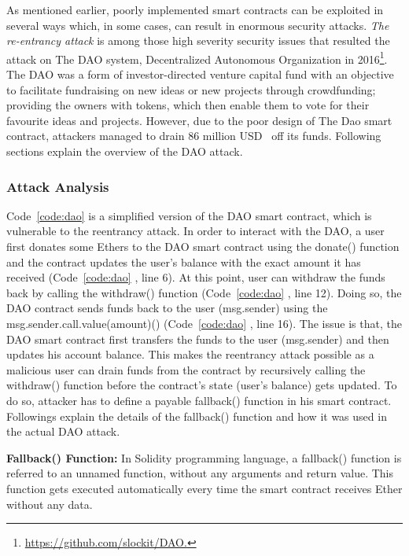 
As mentioned earlier, poorly implemented smart contracts can be exploited in several ways which, in some cases, can result in enormous security attacks. \textit{The re-entrancy attack} is among those high severity security issues that resulted the attack on The DAO system, Decentralized Autonomous Organization in 2016\footnote{\url{https://github.com/slockit/DAO.}}. The DAO was a form of investor-directed venture capital fund with an objective to facilitate fundraising on new ideas or new projects through crowdfunding; providing the owners with tokens, which then enable them to vote for their favourite ideas and projects. However, due to the poor design of The Dao smart contract, attackers managed to drain 86 million USD~\cite{A50Milli86:online} off its funds. Following sections explain the overview of the DAO attack.

\subsubsection{Attack Analysis}
Code~\ref{code:dao} is a simplified version of the DAO smart contract, which is vulnerable to the reentrancy attack. In order to interact with the DAO, a user first donates some Ethers to the DAO smart contract using the donate() function and the contract updates the user’s balance with the exact amount it has received (Code~\ref{code:dao} , line 6). At this point, user can withdraw the funds back by calling the withdraw() function (Code~\ref{code:dao} , line 12). Doing so, the DAO contract sends funds back to the user (msg.sender) using the msg.sender.call.value(amount)() (Code~\ref{code:dao} , line 16). The issue is that, the DAO smart contract first transfers the funds to the user (msg.sender) and then updates his account balance. This makes the reentrancy attack possible as a malicious user can drain funds from the contract by recursively calling the withdraw() function before the contract’s state (user’s balance) gets updated. To do so, attacker has to define a payable fallback() function in his smart contract. Followings explain the details of the fallback() function and how it was used in the actual DAO attack.

\textbf{Fallback() Function:} In Solidity programming language, a fallback() function is referred to an unnamed function, without any arguments and return value. This function gets executed automatically every time the smart contract receives Ether without any data.

